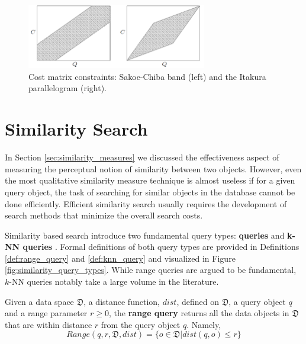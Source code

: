\begin{figure}
\centering
\includegraphics[width=0.7\textwidth]{./figures/dtw_sukoe_chuba}       
\caption{Cost matrix constraints: Sakoe-Chiba band (left) and the Itakura parallelogram (right).}
\label{fig:dtw_sukoe_chuba}
\end{figure}

\newpage{}

\section{Similarity Search}
\label{sec:similarity_search}
 
\iftoggle{edit-mode}{\hspace{0pt}\marginpar{Introduction}}{}
In Section \ref{sec:similarity_measures} we discussed the effectiveness aspect of measuring the perceptual notion of similarity between two objects.
However, even the most qualitative similarity measure technique is almost useless if for a given query object, the task of searching for similar objects in the database cannot be done efficiently.
Efficient similarity search usually requires the development of search methods that minimize the overall search costs.

\iftoggle{edit-mode}{\hspace{0pt}\marginpar{Similarity search query types}}{}
Similarity based search introduce two fundamental query types: \textbf{queries} and \textbf{k-NN queries} \cite{hetland2009basic}. 
Formal definitions of both query types are provided in Definitions \ref{def:range_query} and \ref{def:knn_query} and visualized in Figure \ref{fig:similarity_query_types}.
While range queries are argued to be fundamental, $k$-NN queries notably take a large volume in the literature.

\begin{definition}
Given a data space $\mathfrak{D}$, a distance function, $dist$, defined on $\mathfrak{D}$, a query object $q$ and a range parameter $r \geq 0$, the \textbf{range query} returns all the data objects in $\mathfrak{D}$ that are within distance $r$ from the query object $q$. 
Namely,
\begin{equation}
Range(q,r,\mathfrak{D},dist)=\{o \in \mathfrak{D} | dist(q,o) \leq r \}
\end{equation}
\label{def:range_query} 
\end{definition}

